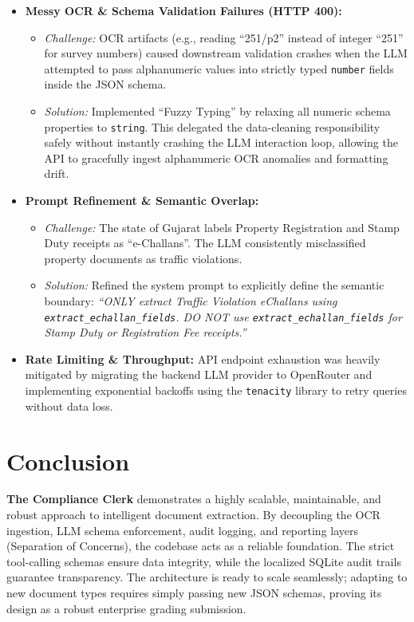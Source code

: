 \documentclass[11pt]{article}
\begin{document}
\begin{itemize}
    \item \textbf{Messy OCR \& Schema Validation Failures (HTTP 400):} 
    \begin{itemize}
        \item \textit{Challenge:} OCR artifacts (e.g., reading ``251/p2'' instead of integer ``251'' for survey numbers) caused downstream validation crashes when the LLM attempted to pass alphanumeric values into strictly typed \texttt{number} fields inside the JSON schema.
        \item \textit{Solution:} Implemented ``Fuzzy Typing'' by relaxing all numeric schema properties to \texttt{string}. This delegated the data-cleaning responsibility safely without instantly crashing the LLM interaction loop, allowing the API to gracefully ingest alphanumeric OCR anomalies and formatting drift.
    \end{itemize}
    
    \item \textbf{Prompt Refinement \& Semantic Overlap:} 
    \begin{itemize}
        \item \textit{Challenge:} The state of Gujarat labels Property Registration and Stamp Duty receipts as ``e-Challans''. The LLM consistently misclassified property documents as traffic violations.
        \item \textit{Solution:} Refined the system prompt to explicitly define the semantic boundary: \textit{``ONLY extract Traffic Violation eChallans using \texttt{extract\_echallan\_fields}. DO NOT use \texttt{extract\_echallan\_fields} for Stamp Duty or Registration Fee receipts.''}
    \end{itemize}
    
    \item \textbf{Rate Limiting \& Throughput:} API endpoint exhaustion was heavily mitigated by migrating the backend LLM provider to OpenRouter and implementing exponential backoffs using the \texttt{tenacity} library to retry queries without data loss.
\end{itemize}

\section{Conclusion}
\textbf{The Compliance Clerk} demonstrates a highly scalable, maintainable, and robust approach to intelligent document extraction. By decoupling the OCR ingestion, LLM schema enforcement, audit logging, and reporting layers (Separation of Concerns), the codebase acts as a reliable foundation. The strict tool-calling schemas ensure data integrity, while the localized SQLite audit trails guarantee transparency. The architecture is ready to scale seamlessly; adapting to new document types requires simply passing new JSON schemas, proving its design as a robust enterprise grading submission.
\end{document}
